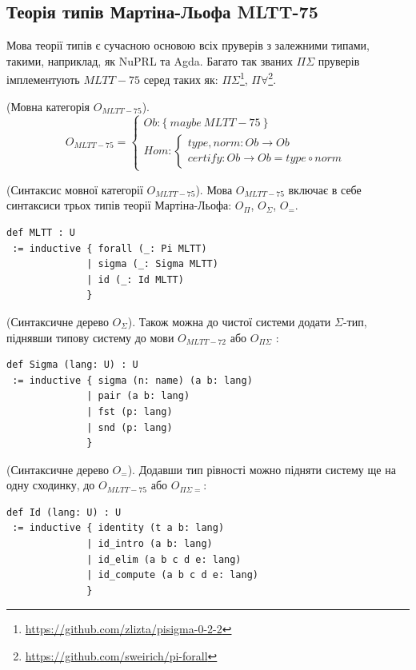 \newpage
\subsection{Теорія типів Мартіна-Льофа MLTT-75}
Мова теорії типів є сучасною основою всіх пруверів з залежними типами,
такими, наприклад, як NuPRL та Agda. Багато так званих $\Pi\Sigma$ пруверів
імплементують $MLTT-75$ серед таких як:
$\Pi\Sigma$\footnote{\url{https://github.com/zlizta/pisigma-0-2-2}},
$\Pi\forall$\footnote{\url{https://github.com/sweirich/pi-forall}}.

\begin{definition} (Мовна категорія $O_{MLTT-75}$).
\begin{equation}
O_{MLTT-75} =
\begin{cases}
Ob: \{\ maybe\ MLTT-75\ \} \\
Hom: \begin{cases}
type,norm: Ob \rightarrow Ob \\
certify: Ob \rightarrow Ob = type \circ norm
\end{cases}
\end{cases}
\end{equation}
\end{definition}

\begin{definition} (Синтаксис мовної категорії $O_{MLTT-75}$).
Мова $O_{MLTT-75}$ включає в себе синтаксиси трьох типів
теорії Мартіна-Льофа: $O_\Pi$, $O_\Sigma$, $O_=$.
\begin{lstlisting}
def MLTT : U
 := inductive { forall (_: Pi MLTT)
              | sigma (_: Sigma MLTT)
              | id (_: Id MLTT)
              }
\end{lstlisting}
\end{definition}

\begin{definition} (Синтаксичне дерево $O_\Sigma$).
Також можна до чистої системи додати $\Sigma$-тип,
піднявши типову систему до мови $O_{MLTT-72}$ або $O_{\Pi\Sigma}$ :
\begin{lstlisting}[mathescape=true]
def Sigma (lang: U) : U
 := inductive { sigma (n: name) (a b: lang)
              | pair (a b: lang)
              | fst (p: lang)
              | snd (p: lang)
              }
\end{lstlisting}
\end{definition}

\begin{definition} (Синтаксичне дерево $O_=$).
Додавши тип рівності можно підняти систему ще на одну сходинку,
до $O_{MLTT-75}$ або $O_{\Pi\Sigma=}$:
\begin{lstlisting}[mathescape=true]
def Id (lang: U) : U
 := inductive { identity (t a b: lang)
              | id_intro (a b: lang)
              | id_elim (a b c d e: lang)
              | id_compute (a b c d e: lang)
              }
\end{lstlisting}
\end{definition}

